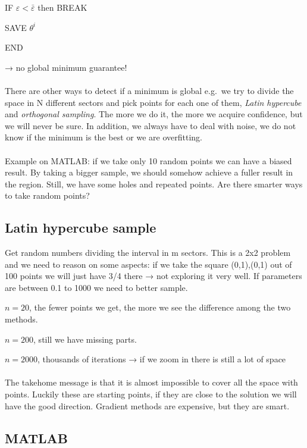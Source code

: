 IF $\varepsilon<\bar{\varepsilon}$ then BREAK

SAVE $\theta^i$

END

→ no global minimum guarantee!
\\
\\
\noindent
There are other ways to detect if a minimum is global e.g.~we try to
divide the space in N different sectors and pick points for each one of
them, \emph{Latin hypercube} and \emph{orthogonal sampling}. The more we
do it, the more we acquire confidence, but we will never be sure. In
addition, we always have to deal with noise, we do not know if the
minimum is the best or we are overfitting.
\\
\\
\noindent
Example on MATLAB: if we take only 10 random points we can have a biased
result. By taking a bigger sample, we should somehow achieve a fuller
result in the region. Still, we have some holes and repeated points. Are
there smarter ways to take random points?


\subsection{Latin hypercube sample}

Get random numbers dividing the interval in m sectors. This is a 2x2
problem and we need to reason on some aspects: if we take the square
(0,1),(0,1) out of 100 points we will just have 3/4 there → not
exploring it very well. If parameters are between 0.1 to 1000 we need to
better sample.

$n = 20$, the fewer points we get, the more we see the difference among
the two methods.

$n = 200$, still we have missing parts.

$n = 2000$, thousands of iterations → if we zoom in there is still a lot
of space
\\
\\
\noindent
The takehome message is that it is almost impossible to cover all the
space with points. Luckily these are starting points, if they are close
to the solution we will have the good direction. Gradient methods are
expensive, but they are smart.


\subsection{MATLAB}


